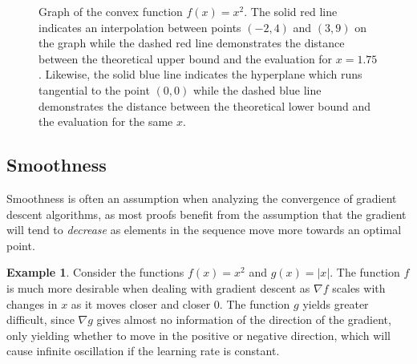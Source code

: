 \documentclass{article}
\theoremstyle{definition}
\newtheorem{example}{Example}
\begin{document}
\begin{figure}[t]
    \begin{center}
    \end{center}
    \caption{Graph of the convex function $f(x) = x^2$. The solid red line
    indicates an interpolation between points $(-2, 4)$ and $(3, 9)$ on the
    graph while the dashed red line demonstrates the distance between the
    theoretical upper bound and the evaluation for $x = 1.75$. Likewise, the
    solid blue line indicates the hyperplane which runs tangential to the point
    $(0, 0)$ while the dashed blue line demonstrates the distance between the
    theoretical lower bound and the evaluation for the same $x$.}%
    \label{fig:convex}
\end{figure}

\subsection{Smoothness}

Smoothness is often an assumption when analyzing the convergence of gradient
descent algorithms, as most proofs benefit from the assumption that the gradient
will tend to \emph{decrease} as elements in the sequence move more towards an
optimal point. 

\begin{example}
    Consider the functions $f(x) = x^2$ and $g(x) = |x|$. The function $f$ is
    much more desirable when dealing with gradient descent as $\nabla f$ scales
    with changes in $x$ as it moves closer and closer 0. The
    function $g$ yields greater difficult, since $\nabla g$ gives almost no
    information of the direction of the gradient, only yielding whether to move
    in the positive or negative direction, which will cause infinite oscillation
    if the learning rate is constant.
\end{example}
\end{document}
